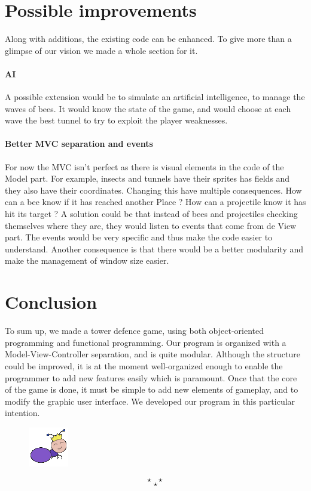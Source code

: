 \documentclass[a4paper]{article}
\newcommand{\theEnd}{\[\star ~ ~ ~ \star\]\[\star\]}
\begin{document}
\section{Possible improvements} %

Along with additions, the existing code can be enhanced. To give more than a glimpse of our vision we made a whole section for it.


\paragraph{AI} A possible extension would be to simulate an artificial intelligence, to manage the waves of bees. It would know the state of the game, and would choose at each wave the best tunnel to try to exploit the player weaknesses.

\paragraph{Better MVC separation and events} For now the MVC isn't perfect as there is visual elements in the code of the Model part. For example, insects and tunnels have their sprites has fields and they also have their coordinates. Changing this have multiple consequences. How can a bee know if it has reached another Place ? How can a projectile know it has hit its target ? A solution could be that instead of bees and projectiles checking themselves where they are, they would listen to events that come from de View part. The events would be very specific and thus make the code easier to understand. Another consequence is that there would be a better modularity and make the management of window size easier.

\section*{Conclusion} %

To sum up, we made a tower defence game, using both object-oriented programming and functional programming. Our program is organized with a Model-View-Controller separation, and is quite modular. Although the structure could be improved, it is at the moment well-organized enough to enable the programmer to add new features easily which is paramount. Once that the core of the game is done, it must be simple to add new elements of gameplay, and to modify the graphic user interface. We developed our program in this particular intention.

\begin{figure}[H]
	\center
	\includegraphics[scale=0.5]{ant_queen.png}
\end{figure}

\theEnd
\end{document}
